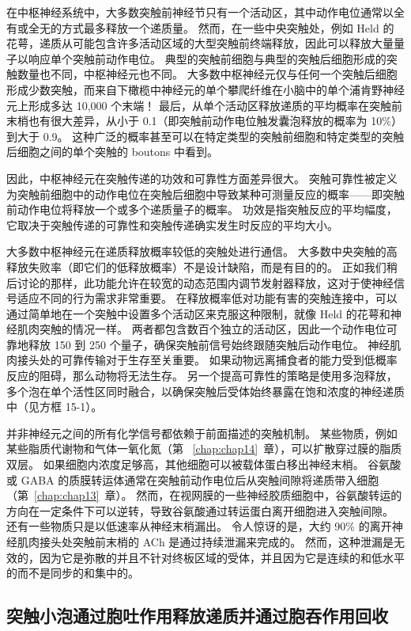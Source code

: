 在中枢神经系统中，大多数突触前神经节只有一个活动区，其中动作电位通常以全有或全无的方式最多释放一个递质量。
然而，在一些中央突触处，例如 Held 的花萼，递质从可能包含许多活动区域的大型突触前终端释放，因此可以释放大量量子以响应单个突触前动作电位。
典型的突触前细胞与典型的突触后细胞形成的突触数量也不同，中枢神经元也不同。
大多数中枢神经元仅与任何一个突触后细胞形成少数突触，而来自下橄榄中神经元的单个攀爬纤维在小脑中的单个浦肯野神经元上形成多达 10,000 个末端！
最后，从单个活动区释放递质的平均概率在突触前末梢也有很大差异，从小于 0.1（即突触前动作电位触发囊泡释放的概率为 10\%）到大于 0.9。
这种广泛的概率甚至可以在特定类型的突触前细胞和特定类型的突触后细胞之间的单个突触的 boutons 中看到。


因此，中枢神经元在突触传递的功效和可靠性方面差异很大。
突触可靠性被定义为突触前细胞中的动作电位在突触后细胞中导致某种可测量反应的概率——即突触前动作电位将释放一个或多个递质量子的概率。
功效是指突触反应的平均幅度，它取决于突触传递的可靠性和突触传递确实发生时反应的平均大小。


大多数中枢神经元在递质释放概率较低的突触处进行通信。
大多数中央突触的高释放失败率（即它们的低释放概率）不是设计缺陷，而是有目的的。
正如我们稍后讨论的那样，此功能允许在较宽的动态范围内调节发射器释放，这对于使神经信号适应不同的行为需求非常重要。
在释放概率低对功能有害的突触连接中，可以通过简单地在一个突触中设置多个活动区来克服这种限制，就像 Held 的花萼和神经肌肉突触的情况一样。
两者都包含数百个独立的活动区，因此一个动作电位可靠地释放 150 到 250 个量子，确保突触前信号始终跟随突触后动作电位。
神经肌肉接头处的可靠传输对于生存至关重要。
如果动物远离捕食者的能力受到低概率反应的阻碍，那么动物将无法生存。
另一个提高可靠性的策略是使用多泡释放，多个泡在单个活性区同时融合，以确保突触后受体始终暴露在饱和浓度的神经递质中（见方框 15-1）。


并非神经元之间的所有化学信号都依赖于前面描述的突触机制。
某些物质，例如某些脂质代谢物和气体一氧化氮（第 ~\ref{chap:chap14}~章），可以扩散穿过膜的脂质双层。
如果细胞内浓度足够高，其他细胞可以被载体蛋白移出神经末梢。
谷氨酸或 GABA 的质膜转运体通常在突触前动作电位后从突触间隙将递质带入细胞（第~\ref{chap:chap13}~章）。
然而，在视网膜的一些神经胶质细胞中，谷氨酸转运的方向在一定条件下可以逆转，导致谷氨酸通过转运蛋白离开细胞进入突触间隙。
还有一些物质只是以低速率从神经末梢漏出。
令人惊讶的是，大约 90\% 的离开神经肌肉接头处突触前末梢的 ACh 是通过持续泄漏来完成的。
然而，这种泄漏是无效的，因为它是弥散的并且不针对终板区域的受体，并且因为它是连续的和低水平的而不是同步的和集中的。



\subsection{突触小泡通过胞吐作用释放递质并通过胞吞作用回收}

